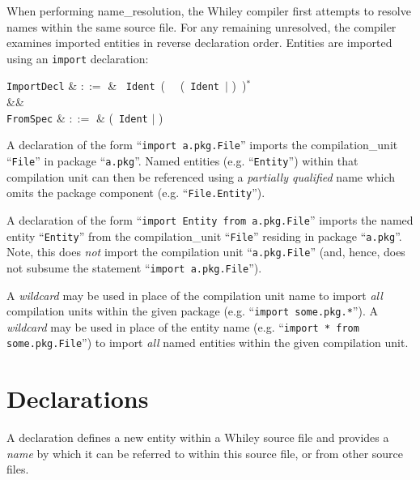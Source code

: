 When performing \gls{name_resolution}, the Whiley compiler first attempts to resolve names within the same source file.  For any remaining unresolved, the compiler examines imported entities in reverse declaration order.  Entities are imported using an \lstinline{import} declaration:

\begin{syntax}
\verb+ImportDecl+ & $::=$ &  \ \verb+Ident+\ \Big(\  \ \big(\ \verb+Ident+\ $|$ \token{*}\big)\ \Big)$^*$\\
&&\\
\verb+FromSpec+ & $::=$ & \big(\ \verb+Ident+ $|$ \token{*} \big) \\
\end{syntax}

A declaration of the form ``\lstinline{import a.pkg.File}'' imports the \gls{compilation_unit} ``\lstinline{File}'' in package ``\lstinline{a.pkg}''.  Named entities (e.g. ``\lstinline{Entity}'') within that compilation unit can then be referenced using a {\em partially qualified} name which omits the package component (e.g. ``\lstinline{File.Entity}'').  

A declaration of the form ``\lstinline{import Entity from a.pkg.File}'' imports the named entity ``\lstinline{Entity}'' from the \gls{compilation_unit} ``\lstinline{File}'' residing in package ``\lstinline{a.pkg}''.  Note, this does {\em not} import the compilation unit ``\lstinline{a.pkg.File}'' (and, hence, does not subsume the statement ``\lstinline{import a.pkg.File}'').

A {\em wildcard} may be used in place of the compilation unit name to import {\em all} compilation units within the given package (e.g. ``\lstinline{import some.pkg.*}'').  A {\em wildcard} may be used in place of the entity name (e.g. ``\lstinline{import * from some.pkg.File}'') to import {\em all} named entities within the given compilation unit.  


\section{Declarations}

A \gls{declaration} defines a new entity within a Whiley source file and provides a {\em name} by which it can be referred to within this source file, or from other source files.

